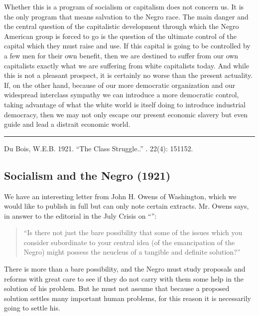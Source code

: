 \documentclass[letterpaper,10pt,english]{jupyterBook}
\begin{document}
\sphinxAtStartPar
Whether this is a program of socialism or capitalism does not concern us. It is the only program that means salvation to the Negro race. The main danger and the central question of the capitalistic development through which the Negro American group is forced to go is the question of the ultimate control of the capital which they must raise and use. If this capital is going to be controlled by a few men for their own benefit, then we are destined to suffer from our own capitalists exactly what we are suffering from white capitalists today. And while this is not a pleasant prospect, it is certainly no worse than the present actuality. If, on the other hand, because of our more democratic organization and our widespread inter\sphinxhyphen{}class sympathy we can introduce a more democratic control, taking advantage of what the white world is itself doing to introduce industrial democracy, then we may not only escape our present economic slavery but even guide and lead a distrait economic world.


\bigskip\hrule\bigskip


\sphinxAtStartPar
{} Du Bois, W.E.B. 1921. “The Class Struggle..” . 22(4): 151\sphinxhyphen{}152.


\subsection{Socialism and the Negro (1921)}
\label{\detokenize{Volumes/22/06/socialism_and_the_negro:socialism-and-the-negro-1921}}\label{\detokenize{Volumes/22/06/socialism_and_the_negro::doc}}
\sphinxAtStartPar
We have an interesting letter from John H. Owens of Washington, which we would like to publish in full but can only note certain extracts. Mr. Owens says, in answer to the editorial in the July Crisis on “{\hyperref[\detokenize{Volumes/22/03/negro_and_radical_thought::doc}]{}}”:
\begin{quote}

\sphinxAtStartPar
“Is there not just the bare possibility that some of the issues which you consider subordinate to your central idea (of the emancipation of the Negro) might possess the neucleus of a tangible and definite solution?”
\end{quote}

\sphinxAtStartPar
There is more than a bare possibility, and the Negro must study proposals and reforms with great care to see if they do not carry with them some help in the solution of his problem. But he must not assume that because a proposed solution settles many important human problems, for this reason it is necessarily going to settle his.
\end{document}
